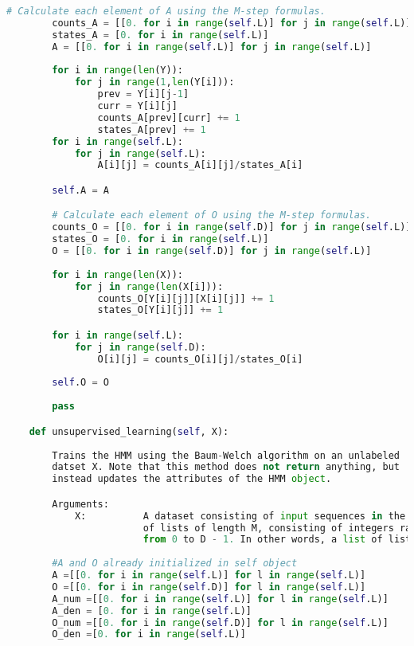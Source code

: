 \begin{lstlisting}[language=Python]
        # Calculate each element of A using the M-step formulas.
        counts_A = [[0. for i in range(self.L)] for j in range(self.L)]
        states_A = [0. for i in range(self.L)]
        A = [[0. for i in range(self.L)] for j in range(self.L)]
        
        for i in range(len(Y)):
            for j in range(1,len(Y[i])):
                prev = Y[i][j-1]
                curr = Y[i][j]
                counts_A[prev][curr] += 1
                states_A[prev] += 1
        for i in range(self.L):
            for j in range(self.L):
                A[i][j] = counts_A[i][j]/states_A[i]

        self.A = A

        # Calculate each element of O using the M-step formulas.
        counts_O = [[0. for i in range(self.D)] for j in range(self.L)]
        states_O = [0. for i in range(self.L)]
        O = [[0. for i in range(self.D)] for j in range(self.L)]
        
        for i in range(len(X)):
            for j in range(len(X[i])):
                counts_O[Y[i][j]][X[i][j]] += 1
                states_O[Y[i][j]] += 1 

        for i in range(self.L):
            for j in range(self.D):
                O[i][j] = counts_O[i][j]/states_O[i]
        
        self.O = O
        
        pass

    def unsupervised_learning(self, X):
        
        Trains the HMM using the Baum-Welch algorithm on an unlabeled
        datset X. Note that this method does not return anything, but
        instead updates the attributes of the HMM object.

        Arguments:
            X:          A dataset consisting of input sequences in the form
                        of lists of length M, consisting of integers ranging
                        from 0 to D - 1. In other words, a list of lists.
        
        #A and O already initialized in self object
        A =[[0. for i in range(self.L)] for l in range(self.L)]
        O =[[0. for i in range(self.D)] for l in range(self.L)]
        A_num =[[0. for i in range(self.L)] for l in range(self.L)]
        A_den = [0. for i in range(self.L)]
        O_num =[[0. for i in range(self.D)] for l in range(self.L)]
        O_den =[0. for i in range(self.L)]
        

\end{lstlisting}
